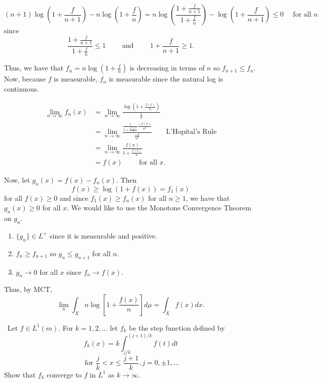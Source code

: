 \documentclass[12pt]{Homework}
\begin{document}
\begin{solution}$\,$
$$(n+1)\log\left(1+\frac{f}{n+1}\right)-n\log\left(1+\frac{f}{n}\right)=n\log\left(\frac{1+\frac{f}{n+1}}{1+\frac{f}{n}}\right)-\log\left(1+\frac{f}{n+1}\right)\le0\quad\text{ for all }n$$ since $$\frac{1+\frac{f}{n+1}}{1+\frac{f}{n}}\le 1\qquad\text{ and }\qquad1+\frac{f}{n+1}\ge 1.$$

Thus, we have that $f_n=n\log\left(1+\frac{f}{n}\right)$ is decreasing in terms of $n$ so $f_{n+1}\le f_n$. Now, because $f$ is measurable, $f_n$ is measurable since the natural log is continuous. 

\begin{align*}
    \lim_{n\to\infty}f_n(x)&=\lim_{n\to\infty}\frac{\log\left(1+\frac{f(x)}{n}\right)}{\frac{1}{n}}\\
    &=\lim_{n\to\infty}\frac{\frac{1}{1+\frac{f(x)}{n}}\frac{-f(x)}{n^2}}{\frac{-1}{n^2}}\qquad\text{L'Hopital's Rule}\\
    &=\lim_{n\to\infty}\frac{f(x)}{1+\frac{f(x)}{n}}\\
    &=f(x)\qquad\text{ for all }x.
\end{align*}

Now, let $g_n(x)=f(x)-f_n(x).$ Then $$f(x)\ge \log(1+f(x))=f_1(x)$$ for all $f(x)\ge0$ and since $f_1(x)\ge f_n(x)$ for all $n\ge1$, we have that $g_n(x)\ge0$ for all $x$. We would like to use the Monotone Convergence Theorem on $g_n$.
\begin{enumerate}
    \item $\{g_n\}\in L^+$ since it is measurable and positive.
    \item $f_n\ge f_{n+1}$ so $g_n\le g_{n+1}$ for all $n$.
    \item $g_n\to 0$ for all $x$ since $f_n\to f(x)$.
\end{enumerate}

Thus, by MCT, $$\lim_n\int_X n\log\left[1+\frac{f(x)}{n}\right]d\mu=\int_Xf(x)dx.$$
\end{solution}
\newpage

\begin{problem} $\,$
Let $f\in L^1(m).$ For $k=1,2,...$ let $f_k$ be the step function defined by $$f_k(x)=k\int_{j/k}^{(j+1)/k}f(t)dt$$ $$\text{ for }\frac{j}{k}<x\le\frac{j+1}{k},j=0,\pm1,...$$
Show that $f_k$ converge to $f$ in $L^1$ as $k\to\infty$.
\end{problem}
\end{document}
